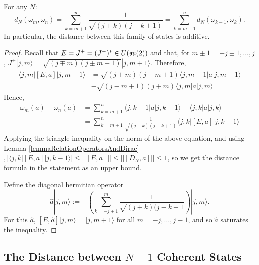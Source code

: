 \begin{theorem}\label{theoremDistanceDiscreteStates}
For any $N$:
\begin{equation}
    d_N(\omega_m, \omega_n) = \sum_{k = m+1}^n \frac{1}{\sqrt{(j+k)(j-k+1)}} = \sum_{k = m+1}^n d_N(\omega_{k-1}, \omega_k).
\end{equation}
In particular, the distance between this family of states is additive.
\end{theorem}

\begin{proof}
Recall that $E = J^+ = (J^-)^* \in U(\mathfrak{su}(2))$ and that, for $m \pm 1 = -j\pm 1, \dots, j$, $J^\pm|j,m\rangle = \sqrt{(j\mp m)(j\pm m + 1)}|j, m+1 \rangle$. Therefore, 
\begin{align*}
    \langle j, m | [E, a] |j, m - 1 \rangle &= \sqrt{(j+m)(j-m+1)} \langle j, m-1| a | j, m-1\rangle \\
    & -\sqrt{(j-m+1)(j+m)} \langle j, m| a | j, m\rangle
\end{align*}
Hence, 
\begin{align*}
    \omega_m(a) - \omega_n(a) &= \sum_{k = m+1}^n \langle j, k-1 |a|j, k-1 \rangle - \langle j, k |a| j, k \rangle \\
    &= \sum_{k = m+1}^n \frac{1}{\sqrt{(j+k)(j-k+1)}} \langle j, k| [E, a] |j, k-1 \rangle
\end{align*}
Applying the triangle inequality on the norm of the above equation, and using Lemma \ref{lemmaRelationOperatorsAndDirac}$, |\langle j, k |[E, a]|j, k-1 \rangle|  \leq ||[E, a]|| \leq ||[D_N, a]|| \leq 1$, so we get the distance formula in the statement as an upper bound. 

Define the diagonal hermitian operator 
\begin{equation}\label{saturatingDiagonalADiscreteBasis}
    \hat a |j, m\rangle := - \left( \sum_{k = -j+1}^m \frac{1}{\sqrt{(j+k)(j-k+1}}  \right)|j, m\rangle.    
\end{equation} 
For this $\hat a$, $[E, \hat a] |j, m \rangle = |j, m+1\rangle$ for all $m = -j, \dots, j-1$, and so $\hat a$ saturates the inequality.
\end{proof}


\subsection{The Distance between $N=1$ Coherent States}

 
